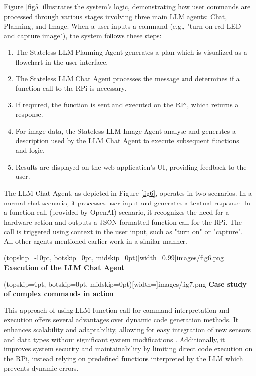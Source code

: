 \documentclass{ieeeaccess}
\begin{document}
Figure \ref{fig5} illustrates the system's logic, demonstrating how user commands are processed through various stages involving three main LLM agents: Chat, Planning, and Image. When a user inputs a command (e.g., "turn on red LED and capture image"), the system follows these steps:

\begin{enumerate}
    \item The Stateless LLM Planning Agent generates a plan which is visualized as a flowchart in the user interface.
    \item The Stateless LLM Chat Agent processes the message and determines if a function call to the RPi is necessary.
    \item If required, the function is sent and executed on the RPi, which returns a response.
    \item For image data, the Stateless LLM Image Agent analyse and generates a description used by the LLM Chat Agent to execute subsequent functions and logic.
    \item Results are displayed on the web application's UI, providing feedback to the user.
\end{enumerate}

The LLM Chat Agent, as depicted in Figure \ref{fig6}, operates in two scenarios. In a normal chat scenario, it processes user input and generates a textual response. In a function call (provided by OpenAI) scenario, it recognizes the need for a hardware action and outputs a JSON-formatted function call for the RPi. The call is triggered using context in the user input, such as "turn on" or "capture". All other agents mentioned earlier work in a similar manner. 

\Figure[h!](topskip=-10pt, botskip=0pt,
midskip=0pt)[width=0.99\columnwidth]{{images/fig6.png}}
{ \textbf{Execution of the LLM Chat Agent}\label{fig6}}

\Figure[t!](topskip=0pt, botskip=0pt,
midskip=0pt)[width=\textwidth]{{images/fig7.png}}
{ \textbf{Case study of complex commands in action}\label{fig7}}

This approach of using LLM function call for command interpretation and execution offers several advantages over dynamic code generation methods. It enhances scalability and adaptability, allowing for easy integration of new sensors and data types without significant system modifications \cite{yang2023autogptonlinedecisionmaking}. Additionally, it improves system security and maintainability by limiting direct code execution on the RPi, instead relying on predefined functions interpreted by the LLM which prevents dynamic errors.
\end{document}
